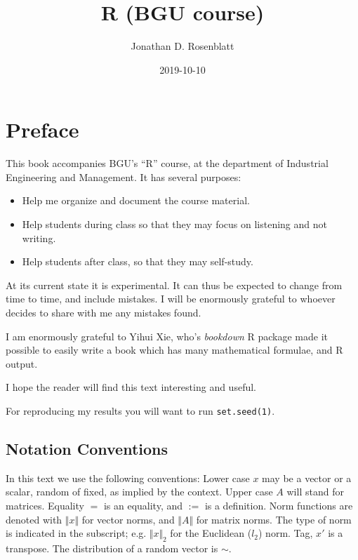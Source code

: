 \documentclass[]{book}
\title{R (BGU course)}
\author{Jonathan D. Rosenblatt}
\date{2019-10-10}
\providecommand{\tightlist}{%
  \setlength{\itemsep}{0pt}\setlength{\parskip}{0pt}}
\theoremstyle{definition}
\theoremstyle{definition}
\theoremstyle{definition}
\theoremstyle{remark}
\begin{document}
\maketitle

{
\setcounter{tocdepth}{1}
\tableofcontents
}
\hypertarget{preface}{%
\chapter{Preface}\label{preface}}

This book accompanies BGU's ``R'' course, at the department of Industrial Engineering and Management.
It has several purposes:

\begin{itemize}
\tightlist
\item
  Help me organize and document the course material.
\item
  Help students during class so that they may focus on listening and not writing.
\item
  Help students after class, so that they may self-study.
\end{itemize}

At its current state it is experimental.
It can thus be expected to change from time to time, and include mistakes.
I will be enormously grateful to whoever decides to share with me any mistakes found.

I am enormously grateful to Yihui Xie, who's \emph{bookdown} R package made it possible to easily write a book which has many mathematical formulae, and R output.

I hope the reader will find this text interesting and useful.

For reproducing my results you will want to run \texttt{set.seed(1)}.

\hypertarget{notation-conventions}{%
\section{Notation Conventions}\label{notation-conventions}}

In this text we use the following conventions:
Lower case \(x\) may be a vector or a scalar, random of fixed, as implied by the context.
Upper case \(A\) will stand for matrices.
Equality \(=\) is an equality, and \(:=\) is a definition.
Norm functions are denoted with \(\Vert x \Vert\) for vector norms, and \(\Vert A \Vert\) for matrix norms.
The type of norm is indicated in the subscript; e.g. \(\Vert x \Vert_2\) for the Euclidean (\(l_2\)) norm.
Tag, \(x'\) is a transpose.
The distribution of a random vector is \(\sim\).
\end{document}
